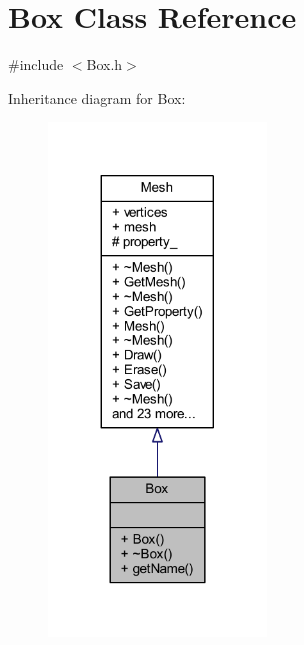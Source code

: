 \hypertarget{class_box}{}\section{Box Class Reference}
\label{class_box}


{\ttfamily \#include $<$Box.\+h$>$}



Inheritance diagram for Box\+:
\nopagebreak
\begin{figure}[H]
\begin{center}
\leavevmode
\includegraphics[width=164pt]{class_box__inherit__graph}
\end{center}
\end{figure}


